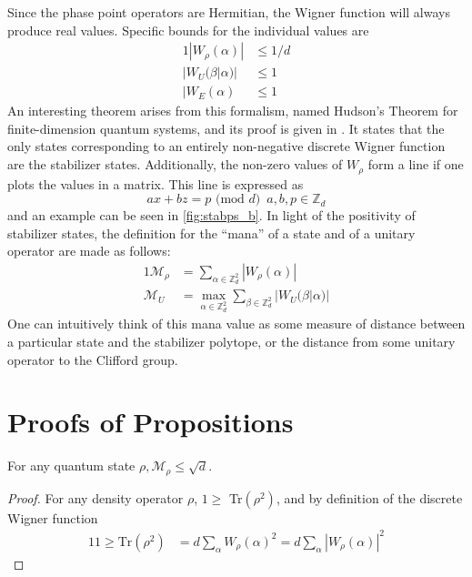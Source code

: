 \documentclass[../3Wworkreport.tex]{subfiles}
\begin{document}
\begin{appendices}
Since the phase point operators are Hermitian, the Wigner function will always produce real values. Specific bounds for the individual values are
\begin{alignat}{1}
	|W_\rho(\alpha)| &\le 1/d\\
	|W_U(\beta | \alpha)| &\le 1\\
	|W_E(\alpha) &\le 1
\end{alignat}
An interesting theorem arises from this formalism, named Hudson's Theorem for finite-dimension quantum systems, and its proof is given in \cite{Gross2006}. It states that the only states corresponding to an entirely non-negative discrete Wigner function are the stabilizer states. Additionally, the non-zero values of $W_\rho$ form a line if one plots the values in a matrix. This line is expressed as
\begin{equation}
	ax + bz = p \text{ (mod }d) \,\,\, a,b,p \in \mathbb{Z}_d
\end{equation}
and an example can be seen in \autoref{fig:stabps_b}. In light of the positivity of stabilizer states, the definition for the ``mana'' of a state and of a unitary operator are made as follows:
\begin{alignat}{1}
	\mathcal{M}_\rho &= \sum\limits_{\alpha \in \mathbb{Z}_d^2} |W_\rho(\alpha)|\\
	\mathcal{M}_U &= \max\limits_{\alpha \in \mathbb{Z}_d^2} \sum\limits_{\beta \in \mathbb{Z}_d^2} |W_U(\beta | \alpha)|
\end{alignat}
One can intuitively think of this mana value as some measure of distance between a particular state and the stabilizer polytope, or the distance from some unitary operator to the Clifford group.


\chapter{Proofs of Propositions}
\label{app:proofs}
\setcounter{prop}{0}

\begin{prop}\label{prop:manarho}
For any quantum state $\rho, \mathcal{M}_\rho \le \sqrt{d}$.
\end{prop}
\begin{proof}
	For any density operator $\rho$, $1 \ge $ Tr$(\rho^2)$, and by definition of the discrete Wigner function
	\begin{alignat}{1}
		1 \ge \text{Tr}(\rho^2) &= d \sum\limits_\alpha W_\rho(\alpha)^2 = d \sum\limits_\alpha |W_\rho(\alpha)|^2
	\end{alignat}


\end{proof}
\end{appendices}
\end{document}
